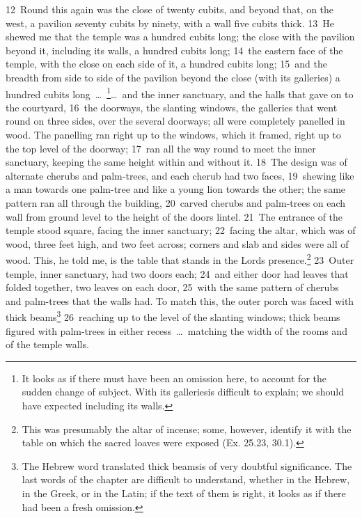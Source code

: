 \documentclass[10pt]{book} %
\begin{document}
\textcolor{benred8}{12}~Round this again was the close of twenty cubits, and beyond that, on the west, a pavilion seventy cubits by ninety, with a wall five cubits thick. \textcolor{benred8}{13}~He shewed me that the temple was a hundred cubits long; the close with the pavilion beyond it, including its walls, a hundred cubits long; \textcolor{benred8}{14}~the eastern face of the temple, with the close on each side of it, a hundred cubits long; \textcolor{benred8}{15}~and the breadth from side to side of the pavilion beyond the close (with its galleries) a hundred cubits long~\ldots\ \footnote[5]{It looks as if there must have been an omission here, to account for the sudden change of subject. \textasciigrave With its galleries\textquotesingle  is difficult to explain; we should have expected \textasciigrave including its walls\textquotesingle .}\ldots\  and the inner sanctuary, and the halls that gave on to the courtyard, \textcolor{benred8}{16}~the doorways, the slanting windows, the galleries that went round on three sides, over the several doorways; all were completely panelled in wood. The panelling ran right up to the windows, which it framed, right up to the top level of the doorway; \textcolor{benred8}{17}~ran all the way round to meet the inner sanctuary, keeping the same height within and without it. \textcolor{benred8}{18}~The design was of alternate cherubs and palm-trees, and each cherub had two faces, \textcolor{benred8}{19}~shewing like a man towards one palm-tree and like a young lion towards the other; the same pattern ran all through the building, \textcolor{benred8}{20}~carved cherubs and palm-trees on each wall from ground level to the height of the door\textquotesingle s lintel.
\textcolor{benred8}{21}~The entrance of the temple stood square, facing the inner sanctuary; \textcolor{benred8}{22}~facing the altar, which was of wood, three feet high, and two feet across; corners and slab and sides were all of wood. This, he told me, is the table that stands in the Lord\textquotesingle s presence.\footnote[6]{This was presumably the altar of incense; some, however, identify it with the table on which the sacred loaves were exposed (Ex. 25.23, 30.1).} \textcolor{benred8}{23}~Outer temple, inner sanctuary, had two doors each; \textcolor{benred8}{24}~and either door had leaves that folded together, two leaves on each door, \textcolor{benred8}{25}~with the same pattern of cherubs and palm-trees that the walls had. To match this, the outer porch was faced with thick beams\footnote[7]{The Hebrew word translated \textasciigrave thick beams\textquotesingle  is of very doubtful significance. The last words of the chapter are difficult to understand, whether in the Hebrew, in the Greek, or in the Latin; if the text of them is right, it looks as if there had been a fresh omission.} \textcolor{benred8}{26}~reaching up to the level of the slanting windows; thick beams figured with palm-trees in either recess~\ldots\  matching the width of the rooms and of the temple walls.
\end{document}
